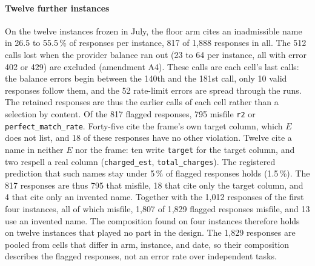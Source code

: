 \documentclass[journal]{IEEEtran}
\begin{document}
\paragraph{Twelve further instances}
On the twelve instances frozen in July, the floor arm cites an inadmissible
name in 26.5 to 55.5\,\% of responses per instance, 817 of 1{,}888 responses
in all. The 512 calls lost when the provider balance ran out (23 to 64 per
instance, all with error 402 or 429) are excluded (amendment A4). These calls
are each cell's last calls: the balance errors begin between the 140th and
the 181st call, only 10 valid responses follow them, and the 52 rate-limit
errors are spread through the runs. The retained responses are thus the
earlier calls of each cell rather than a selection by content. Of the 817
flagged responses, 795 misfile \texttt{r2} or \texttt{perfect\_match\_rate}.
Forty-five cite the frame's own target column, which $E$ does not list, and 18
of these responses have no other violation. Twelve cite a name in neither $E$
nor the frame: ten write \texttt{target} for the target column, and two
respell a real column (\texttt{charged\_est}, \texttt{total\_charges}). The
registered prediction that such names stay under 5\,\% of flagged responses
holds (1.5\,\%). The 817 responses are thus 795 that misfile, 18 that cite
only the target column, and 4 that cite only an invented name. Together with
the 1{,}012 responses of the first four instances, all of which misfile,
1{,}807 of 1{,}829 flagged responses misfile, and 13 use an invented name. The
composition found on four instances therefore holds on twelve instances that
played no part in the design. The 1{,}829 responses are pooled from cells that
differ in arm, instance, and date, so their composition describes the flagged
responses, not an error rate over independent tasks.
\end{document}
